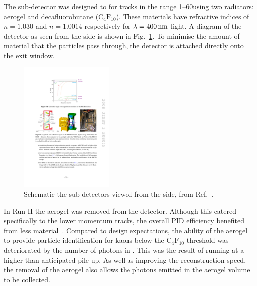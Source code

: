 



\subsubsection{\richone}
The \richone sub-detector was designed to for tracks in the range 1--60\gevc using two radiators: aerogel and decafluorobutane ($\text{C}_{4}\text{F}_{10}$). These materials have refractive indices of $n = 1.030$ and $n = 1.0014$ respectively for $\lambda = 400\mathrm{ \,nm}$ light. A diagram of the \richone detector as seen from the side is shown in Fig.~\ref{fig:Dec_richone_layout}. To minimise the amount of material that the particles pass through, the \richone detector is attached directly onto the \velo exit window.  

\begin{figure}[!h]
    \centering        
    \includegraphics[width=0.4\textwidth]{figs/Detector/richone_layout.pdf}
    \caption{Schematic the \richone sub-detectors viewed from the side, from Ref.~\cite{Alves:2008zz}.}
    \label{fig:Dec_richone_layout}   
\end{figure}

In Run II the aerogel was removed from the \richone detector. Although this catered specifically to the lower momentum tracks, the overall PID efficiency benefited from less material~\cite{PAPANESTIS2017221}. Compared to design expectations, the ability of the aerogel to provide particle identification for kaons below the $\text{C}_{4}\text{F}_{10}$ threshold was deteriorated by the number of photons in \richone. This was the result of \lhcb running at a higher than anticipated pile up. As well as improving the reconstruction speed, the removal of the aerogel also allows the photons emitted in the aerogel volume to be collected. 

